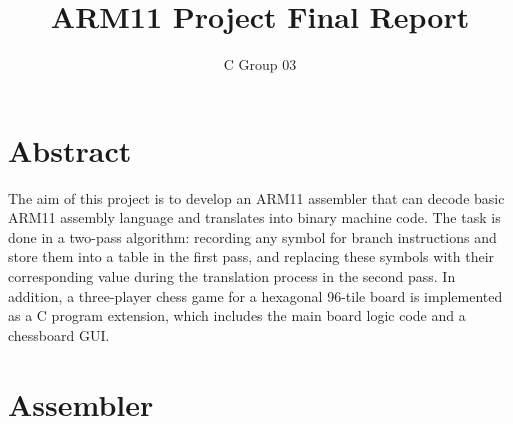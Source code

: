 \documentclass[10pt]{article}
\begin{document}
\title{ARM11 Project Final Report}
\author{C Group 03}

\maketitle

\section{Abstract}
The aim of this project is to develop an ARM11 assembler that can decode basic ARM11 assembly language and translates into binary machine code. The task is done in a two-pass algorithm: recording any symbol for branch instructions and store them into a table in the first pass, and replacing these symbols with their corresponding value during the translation process in the second pass. In addition, a three-player chess game for a hexagonal 96-tile board is implemented as a C program extension, which includes the main board logic code and a chessboard GUI.
\section{Assembler}
\end{document}
